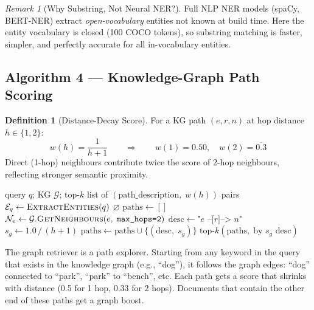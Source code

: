 \documentclass[12pt,a4paper]{article}
\theoremstyle{definition}
\newtheorem{definition}{Definition}[section]
\theoremstyle{plain}
\theoremstyle{remark}
\newtheorem{remark}{Remark}[section]
\begin{document}
\begin{remark}[Why Substring, Not Neural NER?]
Full NLP NER models (spaCy, BERT-NER) extract \emph{open-vocabulary}
entities not known at build time.  Here the entity vocabulary is
closed (100 COCO tokens), so substring matching is faster, simpler,
and perfectly accurate for all in-vocabulary entities.
\end{remark}

\subsection{Algorithm 4 --- Knowledge-Graph Path Scoring}

\begin{definition}[Distance-Decay Score]
\label{def:hopdecay}
For a KG path $(e, r, n)$ at hop distance $h \in \{1, 2\}$:
\[
  w(h) = \frac{1}{h + 1} \qquad\Longrightarrow\qquad
  w(1) = 0.50, \quad w(2) = \overline{0.3}
\]
Direct (1-hop) neighbours contribute twice the score of 2-hop
neighbours, reflecting stronger semantic proximity.
\end{definition}

\begin{algorithm}[H]
\caption{\textsc{GraphRetrieval}$(q,\, k)$ --- KG Path Scoring}
\label{alg:graph}
\begin{algorithmic}[1]
\Require query $q$; KG $\mathcal{G}$; top-$k$
\Ensure list of $(\text{path\_description},\; w(h))$ pairs
\State $\mathcal{E}_q \gets \textsc{ExtractEntities}(q)$
 \Return $\varnothing$ \EndIf
\State $\text{paths} \gets []$
  \State $\mathcal{N}_e \gets \mathcal{G}.\textsc{GetNeighbours}(e,\;
    \texttt{max\_hops=2})$
    \State $\text{desc} \gets
      \texttt{"} e\texttt{ --[}r\texttt{]--> }n\texttt{"}$
    \State $s_g \gets 1.0\,/\,(h + 1)$
    \State $\text{paths} \gets \text{paths} \cup \{(\text{desc},\; s_g)\}$
  \EndFor
\EndFor
\State \Return $\text{top-}k(\text{paths},\; \text{by } s_g \text{ desc})$
\end{algorithmic}
\end{algorithm}

\begin{tcolorbox}[laymanbox]
The graph retriever is a path explorer. Starting from any keyword in the
query that exists in the knowledge graph (e.g., ``dog''), it follows the
graph edges: ``dog'' connected to ``park'', ``park'' to ``bench'', etc.
Each path gets a score that shrinks with distance (0.5 for 1 hop, 0.33
for 2 hops). Documents that contain the other end of these paths get a
graph boost.
\end{tcolorbox}
\end{document}

